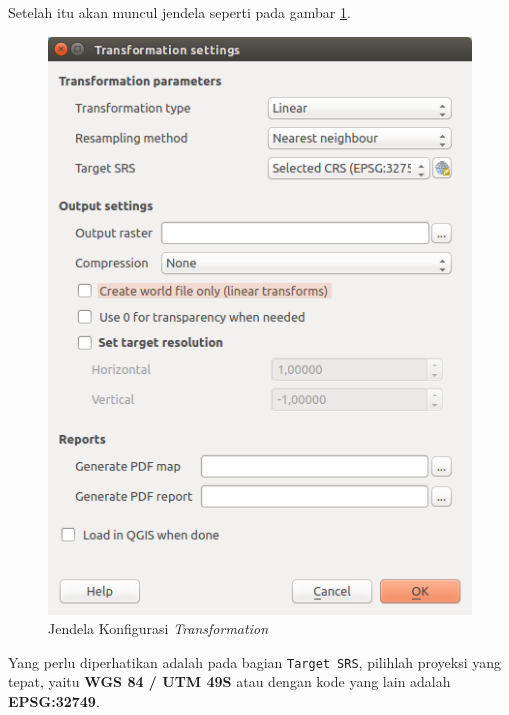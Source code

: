 \begin{enumerate}[1.]
  Setelah itu akan muncul jendela seperti pada gambar \ref{fig:transformationwin}.
  
  \begin{figure}[H]
    \centering
    \includegraphics[width=1\textwidth]{./resources/026-transformation-win}
    \caption{Jendela Konfigurasi \textit{Transformation}}
    \label{fig:transformationwin}
  \end{figure}
  
  Yang perlu diperhatikan adalah pada bagian \verb|Target SRS|, pilihlah proyeksi yang tepat, yaitu \textbf{WGS 84 / UTM 49S} atau dengan kode yang lain adalah \textbf{EPSG:32749}.
  
\end{enumerate}